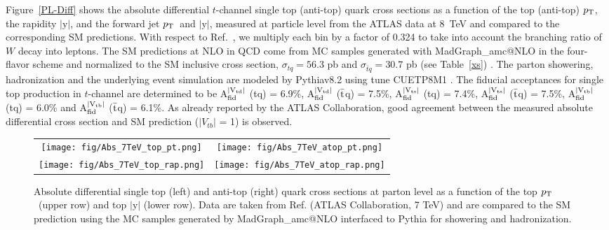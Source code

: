 \documentclass[11pt]{article}
\newcommand{\VTD}{|V_{td}|}
\newcommand{\VTS}{|V_{ts}|}
\newcommand{\VTB}{|V_{tb}|}
\newcommand{\pt}{$p_{\rm T}$}
\begin{document}
Figure~\ref{PL-Diff} shows the absolute differential $t$-channel single top (anti-top) quark cross sections as a function of the top (anti-top) \pt , the rapidity $|\text{y}|$, and the forward jet \pt ~and $|\text{y}|$, measured at particle level from the ATLAS data at 8~TeV and compared to the corresponding SM predictions. With respect to Ref.~\cite{Aaboud:2017pdi}, we multiply each bin by a factor of 0.324 to take into account the branching ratio of $W$ decay into leptons.
The SM predictions at NLO in QCD come from MC samples generated with {\sc MadGraph\_}a{\sc mc@NLO} in the four-flavor scheme and normalized to the SM inclusive cross section, $\sigma_{tq}=56.3$ pb and  $\sigma_{\bar{t}q}=30.7$ pb (see Table~\ref{xs}) \cite{Campbell:2009ss}. The parton showering, hadronization and the underlying event simulation are modeled by {\sc Pythia}v8.2 using tune CUETP8M1 \cite{Khachatryan:2015pea}.
The fiducial acceptances for single top production in $t$-channel are determined to be A$_{\rm fid}^{\rm \VTD}$ (tq) = 6.9\%, A$_{\rm fid}^{\rm \VTD}$ ($\bar{\rm t}$q) = 7.5\%, A$_{\rm fid}^{\rm \VTS}$ (tq) = 7.4\%, A$_{\rm fid}^{\rm \VTS}$ ($\bar{\rm t}$q) = 7.5\%, A$_{\rm fid}^{\rm \VTB}$ (tq) = 6.0\% and A$_{\rm fid}^{\rm \VTB}$ ($\bar{\rm t}$q) = 6.1\%.
As already reported by the ATLAS Collaboration, good agreement between the measured absolute differential cross section and SM prediction ($\VTB$ = 1) is observed.

\begin{figure}[!ht]
  \begin{center}
    \begin{tabular}{cc}
      \texttt{[image: fig/Abs\_7TeV\_top\_pt.png]}&
      \texttt{[image: fig/Abs\_7TeV\_atop\_pt.png]}\\
      \texttt{[image: fig/Abs\_7TeV\_top\_rap.png]}&
      \texttt{[image: fig/Abs\_7TeV\_atop\_rap.png]}\\
    \end{tabular}
    \caption{Absolute differential single top (left) and anti-top (right) quark cross sections at parton level as a function of the top \pt~(upper row) and top $|\text{y}|$ (lower row). Data are taken from Ref. \cite{Aad:2014fwa} (ATLAS Collaboration, 7 TeV)  and are compared to the SM prediction using the MC samples generated by  {\sc MadGraph\_}a{\sc mc@NLO}  interfaced to {\sc Pythia} for showering and hadronization.
    \label{PL-Diff-7TeV}}
  \end{center}
\end{figure}
\end{document}
